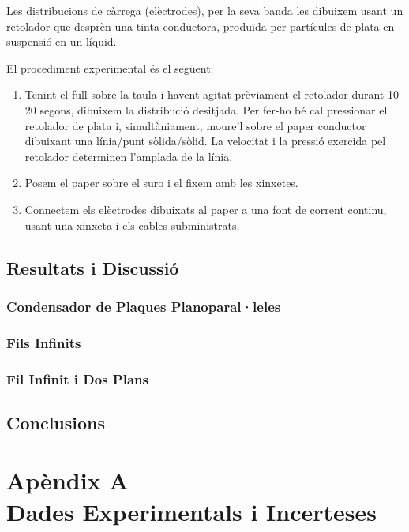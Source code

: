 \documentclass[a4paper,11pt]{report}
\begin{document}
	Les distribucions de càrrega (elèctrodes), per la seva banda les dibuixem usant un retolador que desprèn una tinta conductora, produïda per partícules de plata en suspensió en un líquid.  
	
	El procediment experimental és el següent:
	\begin{enumerate}
		\item Tenint el full sobre la taula i havent agitat prèviament el retolador durant 10-20 segons, dibuixem la distribució desitjada. Per fer-ho bé cal pressionar el retolador de plata i, simultàniament, moure'l sobre el paper conductor dibuixant una línia/punt sòlida/sòlid. La velocitat i la pressió exercida pel retolador determinen l'amplada de la línia.
		\item Posem el paper sobre el suro i el fixem amb les xinxetes.
		\item Connectem els elèctrodes dibuixats al paper a una font de corrent continu, usant una xinxeta i els cables subministrats.
	\end{enumerate}
	\section{Resultats i Discussió}
	\subsection{Condensador de Plaques Planoparal·leles}
	\subsection{Fils Infinits}
	\subsection{Fil Infinit i Dos Plans}
	
	\section{Conclusions}
	
	\newpage
	
	\appendix %
	
	\chapter*{Apèndix A\\[0.5cm] Dades Experimentals i Incerteses}
	
\end{document}
